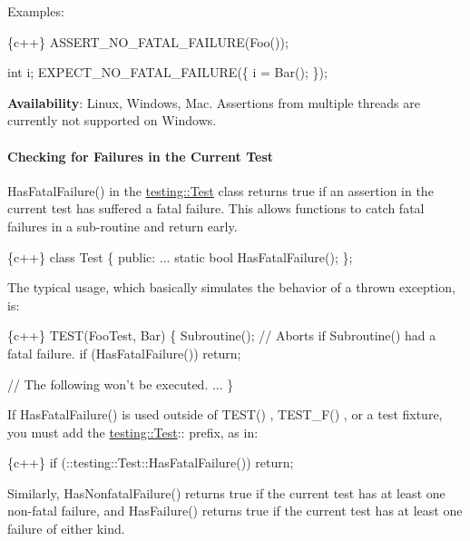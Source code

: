 Examples\+:


\begin{DoxyCode}
\{c++\}
ASSERT\_NO\_FATAL\_FAILURE(Foo());

int i;
EXPECT\_NO\_FATAL\_FAILURE(\{
  i = Bar();
\});
\end{DoxyCode}


{\bfseries Availability}\+: Linux, Windows, Mac. Assertions from multiple threads are currently not supported on Windows.

\paragraph*{Checking for Failures in the Current Test}

{\ttfamily Has\+Fatal\+Failure()} in the {\ttfamily \hyperlink{classtesting_1_1Test}{testing\+::\+Test}} class returns {\ttfamily true} if an assertion in the current test has suffered a fatal failure. This allows functions to catch fatal failures in a sub-\/routine and return early.


\begin{DoxyCode}
\{c++\}
class Test \{
 public:
  ...
  static bool HasFatalFailure();
\};
\end{DoxyCode}


The typical usage, which basically simulates the behavior of a thrown exception, is\+:


\begin{DoxyCode}
\{c++\}
TEST(FooTest, Bar) \{
  Subroutine();
  // Aborts if Subroutine() had a fatal failure.
  if (HasFatalFailure()) return;

  // The following won't be executed.
  ...
\}
\end{DoxyCode}


If {\ttfamily Has\+Fatal\+Failure()} is used outside of {\ttfamily T\+E\+S\+T()} , {\ttfamily T\+E\+S\+T\+\_\+\+F()} , or a test fixture, you must add the {\ttfamily \hyperlink{classtesting_1_1Test}{testing\+::\+Test}\+:\+:} prefix, as in\+:


\begin{DoxyCode}
\{c++\}
if (::testing::Test::HasFatalFailure()) return;
\end{DoxyCode}


Similarly, {\ttfamily Has\+Nonfatal\+Failure()} returns {\ttfamily true} if the current test has at least one non-\/fatal failure, and {\ttfamily Has\+Failure()} returns {\ttfamily true} if the current test has at least one failure of either kind.

